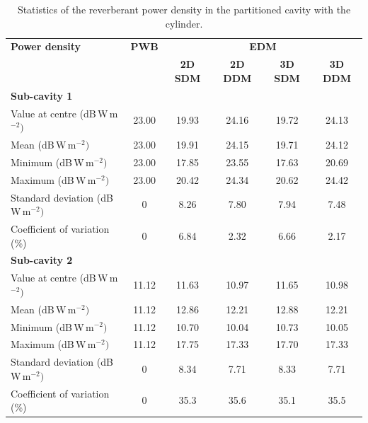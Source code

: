 \documentclass[a4paper]{article}
\numberwithin{equation}{section}
\begin{document}
\begin{table}[ht]
\begin{center}
\begin{tabular}{|l|c|c|c|c|c|}
\hline
\textbf{Power density}               &\textbf{PWB} &\multicolumn{4}{|c|}{\textbf{EDM}} \\ \cline{3-6}
{}                                   &{}           &\textbf{2D SDM} &\textbf{2D DDM} &\textbf{3D SDM} &\textbf{3D DDM} \\
\hline
\multicolumn{6}{|l|}{\textbf{Sub-cavity 1}} \\
\hline
Value at centre (dB\,W\,m$^{-2})$    &23.00        &19.93           &24.16           &19.72           &24.13 \\
Mean (dB\,W\,m$^{-2})$               &23.00        &19.91           &24.15           &19.71           &24.12 \\
Minimum (dB\,W\,m$^{-2})$            &23.00        &17.85           &23.55           &17.63           &20.69 \\
Maximum (dB\,W\,m$^{-2})$            &23.00        &20.42           &24.34           &20.62           &24.42 \\
Standard deviation (dB\,W\,m$^{-2})$ &0            &8.26            &7.80            &7.94            &7.48  \\
Coefficient of variation (\%)        &0            &6.84            &2.32            &6.66            &2.17  \\
\hline
\multicolumn{6}{|l|}{\textbf{Sub-cavity 2}} \\
\hline
Value at centre (dB\,W\,m$^{-2})$    &11.12        &11.63           &10.97           &11.65           &10.98 \\
Mean (dB\,W\,m$^{-2})$               &11.12        &12.86           &12.21           &12.88           &12.21 \\
Minimum (dB\,W\,m$^{-2})$            &11.12        &10.70           &10.04           &10.73           &10.05 \\
Maximum (dB\,W\,m$^{-2})$            &11.12        &17.75           &17.33           &17.70           &17.33 \\
Standard deviation (dB\,W\,m$^{-2})$ &0            &8.34            &7.71            &8.33            &7.71  \\
Coefficient of variation (\%)        &0            &35.3            &35.6            &35.1            &35.5  \\
\hline
\end{tabular}
\end{center}
\caption{\label{tb:partcyl} Statistics of the reverberant power density in the partitioned cavity with the cylinder.}
\end{table}
\end{document}
